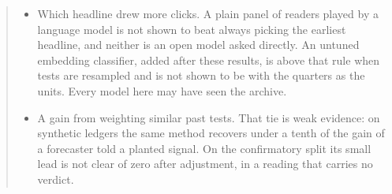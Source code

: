 \documentclass[sigconf,nonacm]{acmart}
\begin{document}
\begin{abstract}
\begin{itemize}
\item Which headline drew more clicks. A plain panel of readers played by a language model is not shown to beat always picking the earliest headline, and neither is an open model asked directly. An untuned embedding classifier, added after these results, is above that rule when tests are resampled and is not shown to be with the quarters as the units. Every model here may have seen the archive.
\item A gain from weighting similar past tests. That tie is weak evidence: on synthetic ledgers the same method recovers under a tenth of the gain of a forecaster told a planted signal. On the confirmatory split its small lead is not clear of zero after adjustment, in a reading that carries no verdict.
\end{itemize}

\end{abstract}
\end{document}
